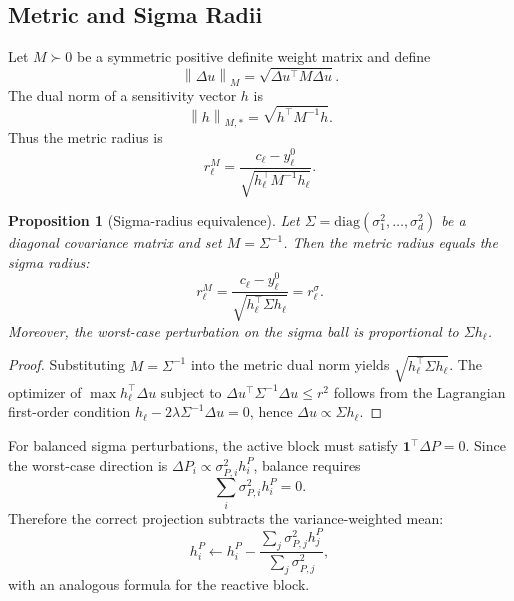 \documentclass[11pt]{article}
\newtheorem{proposition}{Proposition}
\newcommand{\ones}{\mathbf{1}}
\newcommand{\norm}[1]{\left\lVert #1 \right\rVert}
\begin{document}
\subsection{Metric and Sigma Radii}

Let $M\succ0$ be a symmetric positive definite weight matrix and define
\begin{equation}
  \norm{\Delta u}_M = \sqrt{\Delta u^\top M\Delta u}.
\end{equation}
The dual norm of a sensitivity vector $h$ is
\begin{equation}
  \norm{h}_{M,*}=\sqrt{h^\top M^{-1}h}.
\end{equation}
Thus the metric radius is
\begin{equation}
  r_\ell^M=\frac{c_\ell-y_\ell^0}{\sqrt{h_\ell^\top M^{-1}h_\ell}}.
\end{equation}

\begin{proposition}[Sigma-radius equivalence]
\label{prop:sigma}
Let $\Sigma=\mathrm{diag}(\sigma_1^2,\ldots,\sigma_d^2)$ be a diagonal covariance matrix and set $M=\Sigma^{-1}$. Then the metric radius equals the sigma radius:
\begin{equation}
  r_\ell^M
  =
  \frac{c_\ell-y_\ell^0}{\sqrt{h_\ell^\top\Sigma h_\ell}}
  =
  r_\ell^\sigma.
\end{equation}
Moreover, the worst-case perturbation on the sigma ball is proportional to $\Sigma h_\ell$.
\end{proposition}

\begin{proof}
Substituting $M=\Sigma^{-1}$ into the metric dual norm yields
$\sqrt{h_\ell^\top\Sigma h_\ell}$. The optimizer of
$\max h_\ell^\top\Delta u$ subject to
$\Delta u^\top\Sigma^{-1}\Delta u\le r^2$ follows from the Lagrangian first-order condition
$h_\ell-2\lambda\Sigma^{-1}\Delta u=0$, hence
$\Delta u\propto \Sigma h_\ell$.
\end{proof}

For balanced sigma perturbations, the active block must satisfy
$\ones^\top\Delta P=0$. Since the worst-case direction is
$\Delta P_i\propto \sigma_{P,i}^2 h^P_i$, balance requires
\begin{equation}
  \sum_i \sigma_{P,i}^2 h^P_i = 0.
\end{equation}
Therefore the correct projection subtracts the variance-weighted mean:
\begin{equation}
  h_i^P \leftarrow h_i^P -
  \frac{\sum_j \sigma_{P,j}^2 h_j^P}{\sum_j\sigma_{P,j}^2},
\end{equation}
with an analogous formula for the reactive block.
\end{document}
